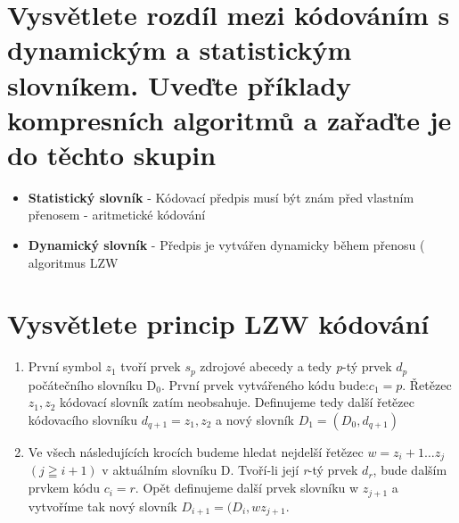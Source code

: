 \section{Vysvětlete rozdíl mezi kódováním s dynamickým a statistickým slovníkem. Uveďte příklady kompresních algoritmů a zařaďte je do těchto skupin}
\begin{itemize}
    \item  \textbf{Statistický slovník} - Kódovací předpis musí být znám před vlastním přenosem - aritmetické kódování
    \item \textbf{Dynamický slovník} - Předpis je vytvářen dynamicky během přenosu ( algoritmus LZW
\end{itemize}

\section{Vysvětlete princip LZW kódování}
\begin{enumerate}
    \item První symbol $z_1$ tvoří prvek $s_p$ zdrojové abecedy a tedy \emph{p}-tý prvek $d_p$ počátečního slovníku D$_0$.
    První prvek vytvářeného kódu bude:$c_1 = p$.
    Řetězec $z_1, z_2$ kódovací slovník zatím neobsahuje.
    Definujeme tedy další řetězec kódovacího slovníku $d_{q+1} = z_1, z_2$ a nový slovník $D_1=(D_0,d_{q+1}) $
    \item Ve všech následujících krocích budeme hledat nejdelší řetězec $w = z_i+1\dots z_j$ $(j\geqq i+1)$ v aktuálním slovníku D.
    Tvoří-li její \emph{r}-tý prvek $d_r$, bude dalším prvkem kódu $c_i=r$. 
    Opět definujeme další prvek slovníku w $z_{j+1}$ a vytvoříme tak nový slovník $D_{i+1} = (D_i, w\mathrm{ }z_{j+1}$.
\end{enumerate}